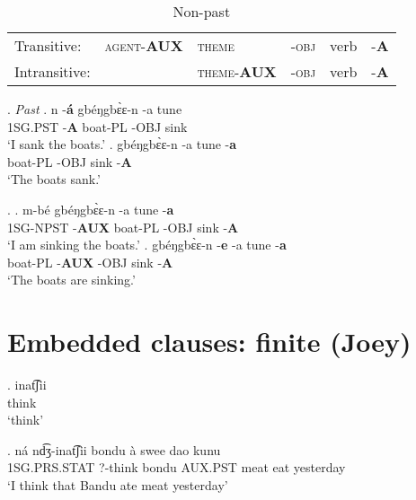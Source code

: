 \documentclass{assets/fieldnotes}
\begin{document}
\begin{table}[!htb]
  \centering
  \caption{Non-past}
  \begin{tabular}{llllll}
    \midrule
    {{Transitive:}}   & \textsc{agent}-\textbf{AUX} & \textsc{theme}          & -\textsc{obj} & verb & -\textbf{A}     \\
    {{Intransitive:}} &                         & \textsc{theme}-\textbf{AUX} & -\textsc{obj} & verb & -\textbf{A} \\
    \midrule
  \end{tabular}
\end{table}

\ex. \textit{Past}
\ag.
n     -\textbf{á}   gbéŋgbɛ̀ɛ-n   -a     tune \\
1SG.PST   -\textbf{A}   boat-PL      -OBJ   sink \\
`I sank the boats.'
\bg.
\phantom{n}     \phantom{-á}            gbéŋgbɛ̀ɛ-n   -a     tune   -\textbf{a} \\
\phantom{1SG}      boat-PL      -OBJ   sink   -\textbf{A} \\
`The boats sank.'

\ex. 
\ag.
m-bé    gbéŋgbɛ̀ɛ-n   {}                        -a     tune   -\textbf{a} \\
1SG-NPST   -\textbf{AUX}   boat-PL         -OBJ   sink   -\textbf{A} \\
`I am sinking the boats.'
\bg.
{}              {}                        gbéŋgbɛ̀ɛ-n   -\textbf{e}     -a     tune   -\textbf{a} \\
\phantom{1SG}      boat-PL      -\textbf{AUX}   -OBJ   sink   -\textbf{A} \\
`The boats are sinking.'


\section{Embedded clauses: finite (Joey)} 



\exg. inat͡ʃii \\
think\\
    `think' 

\exg. ná nd͡ʒ-inat͡ʃii bondu à swee dao kunu\\
1SG.PRS.STAT ?-think bondu AUX.PST meat eat yesterday\\
    `I think that Bandu ate meat yesterday'
\end{document}
